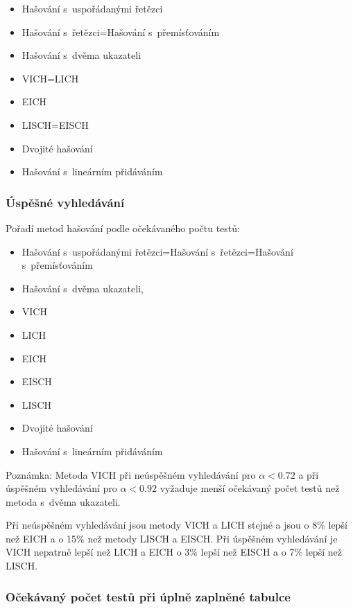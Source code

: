 \documentclass[a4paper,12pt]{article}
\newenvironment{pitemize}{
 \begin{itemize}
   \setlength{\itemsep}{1pt}
   \setlength{\parskip}{0pt}
   \setlength{\parsep}{0pt}
 }{\end{itemize}}
\begin{document}
\begin{pitemize}
\item Hašování s~uspořádanými řetězci 
\item Hašování s~řetězci=Hašování s~přemísťováním 
\item Hašování s~dvěma ukazateli 
\item VICH=LICH 
\item EICH 
\item LISCH=EISCH 
\item Dvojité hašování 
\item Hašování s~lineárním přidáváním
\end{pitemize}
    
\subsubsection{Úspěšné vyhledávání}
Pořadí metod hašování podle očekávaného počtu 
testů:

\begin{pitemize}
\item Hašování s~uspořádanými řetězci=Hašování s~řetězci=Hašo\-vá\-ní s~přemísťováním 
\item Hašování s~dvěma ukazateli, 
\item VICH 
\item LICH 
\item EICH 
\item EISCH 
\item LISCH 
\item Dvojité hašování 
\item Hašování s~lineárním přidáváním
\end{pitemize}

Poznámka: Metoda VICH při neúspěšném vyhledávání pro 
$\alpha <0.72$ a při úspěšném vy\-hledávání pro $
\alpha <0.92$ 
vyžaduje menší očekávaný počet testů než 
metoda s~dvěma ukazateli.

Při neúspěšném vyhledávání jsou metody VICH a LICH stejné a jsou o 8\% lepší než 
EICH a o 15\% než metody LISCH a EISCH. Při úspěšném vyhledávání 
je VICH nepatrně lepší než LICH a EICH o 3\% lepší než 
EISCH a o 7\% lepší než LISCH.

\subsubsection{Očekávaný počet testů při úplně zaplněné 
tabulce}
\end{document}
